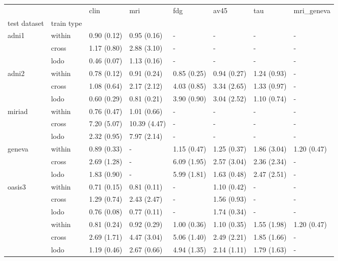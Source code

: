 \begin{sidewaystable}
\centering
\begin{tabular}{llllllll}
\toprule
       &      &         clin &           mri &          fdg &         av45 &          tau &   mri\_geneva \\
test dataset & train type &              &               &              &              &              &              \\
\midrule
adni1 & within &  0.90 (0.12) &   0.95 (0.16) &            - &            - &            - &            - \\
       & cross &  1.17 (0.80) &   2.88 (3.10) &            - &            - &            - &            - \\
       & lodo &  0.46 (0.07) &   1.13 (0.16) &            - &            - &            - &            - \\
\midrule
adni2 & within &  0.78 (0.12) &   0.91 (0.24) &  0.85 (0.25) &  0.94 (0.27) &  1.24 (0.93) &            - \\
       & cross &  1.08 (0.64) &   2.17 (2.12) &  4.03 (0.85) &  3.34 (2.65) &  1.33 (0.97) &            - \\
       & lodo &  0.60 (0.29) &   0.81 (0.21) &  3.90 (0.90) &  3.04 (2.52) &  1.10 (0.74) &            - \\
\midrule
miriad & within &  0.76 (0.47) &   1.01 (0.66) &            - &            - &            - &            - \\
       & cross &  7.20 (5.07) &  10.39 (4.47) &            - &            - &            - &            - \\
       & lodo &  2.32 (0.95) &   7.97 (2.14) &            - &            - &            - &            - \\
\midrule
geneva & within &  0.89 (0.33) &             - &  1.15 (0.47) &  1.25 (0.37) &  1.86 (3.04) &  1.20 (0.47) \\
       & cross &  2.69 (1.28) &             - &  6.09 (1.95) &  2.57 (3.04) &  2.36 (2.34) &            - \\
       & lodo &  1.83 (0.90) &             - &  5.99 (1.81) &  1.63 (0.48) &  2.47 (2.51) &            - \\
\midrule
oasis3 & within &  0.71 (0.15) &   0.81 (0.11) &            - &  1.10 (0.42) &            - &            - \\
       & cross &  1.29 (0.74) &   2.43 (2.47) &            - &  1.56 (0.93) &            - &            - \\
       & lodo &  0.76 (0.08) &   0.77 (0.11) &            - &  1.74 (0.34) &            - &            - \\
\bottomrule
       & within &  0.81 (0.24) &  0.92 (0.29) &  1.00 (0.36) &  1.10 (0.35) &  1.55 (1.98) &  1.20 (0.47) \\
       & cross  &  2.69 (1.71) &  4.47 (3.04) &  5.06 (1.40) &  2.49 (2.21) &  1.85 (1.66) &            - \\
       & lodo   &  1.19 (0.46) &  2.67 (0.66) &  4.94 (1.35) &  2.14 (1.11) &  1.79 (1.63) &            - \\
\bottomrule
\end{tabular}
\end{sidewaystable}
